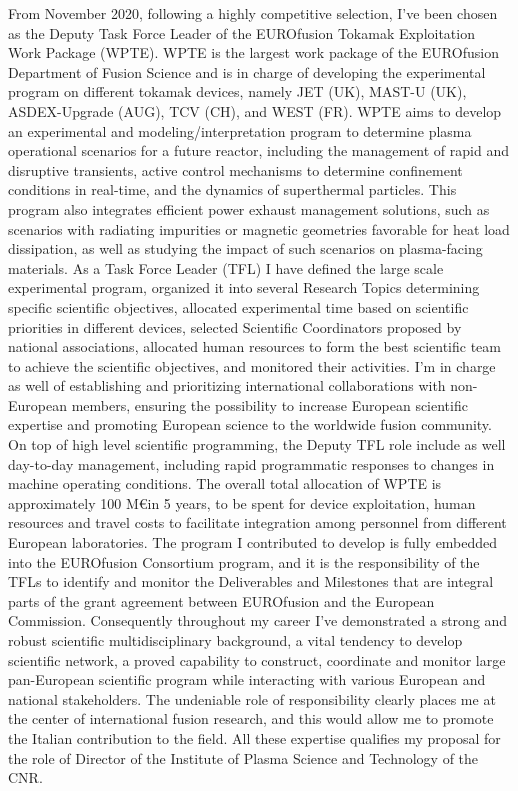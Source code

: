 From November 2020,  following a highly competitive 
selection, I've been 
chosen as the Deputy Task Force Leader of the EUROfusion Tokamak
Exploitation Work Package (WPTE). WPTE is the largest work package of
the EUROfusion Department
of Fusion Science and is in charge of developing the experimental
program on different tokamak devices, namely JET (UK), MAST-U (UK),
ASDEX-Upgrade (AUG), TCV (CH), and WEST (FR).
WPTE aims to develop an experimental and modeling/interpretation
program to determine plasma operational scenarios for a future
reactor, including the
management of rapid and disruptive transients, active control
mechanisms to
determine confinement conditions in real-time, and the dynamics of
superthermal particles.
This program also integrates efficient power exhaust management solutions,
such as scenarios with
radiating impurities or magnetic geometries favorable for heat load
dissipation, as well as studying the impact of such scenarios on
plasma-facing materials.
As a Task Force Leader (TFL) I have defined the large scale experimental program,
organized it into several Research Topics
determining specific scientific objectives, allocated
experimental time based on
scientific priorities in different devices, selected Scientific
Coordinators proposed by
national associations, allocated human resources to form the best
scientific team
to achieve the scientific objectives, and monitored their
activities. I'm in charge as well of establishing and prioritizing
international collaborations with non-European members,  ensuring the possibility to increase
European scientific expertise and promoting European science to the
worldwide fusion community. 
On top of high level scientific programming, the Deputy
TFL role include as well day-to-day management, including rapid
programmatic responses to changes in machine operating conditions. 
The overall total allocation of WPTE is approximately 100 M\euro in 5
years, to be spent for device exploitation,
human resources and travel costs to facilitate integration among
personnel from different European laboratories.
The program I contributed to develop is fully embedded into the 
EUROfusion Consortium program, and it is the responsibility of the
TFLs to
identify and monitor the Deliverables and Milestones that are integral parts of
the grant agreement between
EUROfusion and the European Commission.
Consequently throughout my career I've demonstrated a strong and
robust scientific multidisciplinary background, a vital tendency to develop scientific 
network, a proved capability to construct, coordinate and monitor
large pan-European scientific program while interacting with various European and national
stakeholders. The undeniable role of responsibility clearly places me
at the center of international fusion research, and this would allow
me to promote the Italian contribution to the field.  
All these expertise qualifies my proposal for the role of Director
of the Institute of Plasma Science and Technology of the CNR. 

